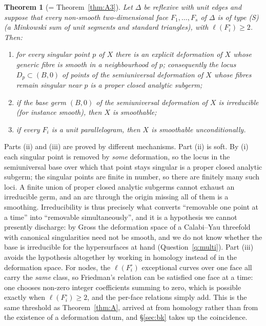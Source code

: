 \documentclass[11pt]{amsart}
\newtheorem{theorem}{Theorem}[section]
\theoremstyle{definition}
\theoremstyle{remark}
\begin{document}
\begin{theorem}[= Theorem~\ref{thm:A3}]\label{thm:Amulti}
Let $\Delta$ be reflexive with unit edges and suppose that every
non-smooth two-dimensional face $F_1,\dots,F_s$ of $\Delta$ is of type
\textup{(S)} (a Minkowski sum of unit segments and standard
triangles), with $\ell(F_i^\circ) \ge 2$.  Then:
\begin{enumerate}
\item for every singular point $p$ of $X$ there is an explicit
deformation of $X$ whose generic fibre is smooth in a neighbourhood of
$p$; consequently the locus $D_p \subset (B,0)$ of points of the
semiuniversal deformation of $X$ whose fibres remain singular near $p$
is a proper closed analytic subgerm;
\item if the base germ $(B,0)$ of the semiuniversal deformation of $X$
is irreducible (for instance smooth), then $X$ is smoothable;
\item if every $F_i$ is a unit parallelogram, then $X$ is smoothable
unconditionally.
\end{enumerate}
\end{theorem}

Parts (ii) and (iii) are proved by different mechanisms.  Part (ii) is
soft.  By (i) each singular point is removed
by \emph{some} deformation, so the locus in the semiuniversal base over
which that point stays singular is a proper closed analytic subgerm; the
singular points are finite in number, so there are finitely many such
loci.  A finite union of proper closed analytic subgerms cannot exhaust
an irreducible germ, and an arc through the origin missing all of them
is a smoothing.  Irreducibility is thus precisely what converts
``removable one point at a time'' into ``removable simultaneously'', and
it is a hypothesis we cannot presently discharge: by Gross
\cite{Gross97} the deformation space of a Calabi--Yau threefold with
canonical singularities need not be smooth, and we do not know whether
the base is irreducible for the hypersurfaces at hand
(Question~\ref{q:multi}).  Part (iii) avoids the
hypothesis altogether by working in homology instead of in the
deformation space.  For nodes, the $\ell(F_i^\circ)$ exceptional curves
over one face all carry the \emph{same} class, so Friedman's relation
can be satisfied one face at a time: one chooses non-zero integer
coefficients summing to zero, which is possible exactly when
$\ell(F_i^\circ) \ge 2$, and the per-face relations simply add.  This
is the same threshold as Theorem~\ref{thm:A}, arrived at from homology
rather than from the existence of a deformation datum, and \S\ref{sec:bk}
takes up the coincidence.
\end{document}
